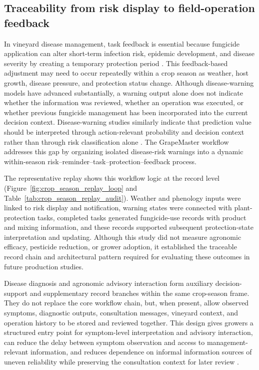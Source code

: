 \documentclass[12pt]{article}
\begin{document}
\subsection{Traceability from risk display to field-operation feedback}\label{traceability-from-risk-display-to-field-operation-feedback}

In vineyard disease management, task feedback is essential because fungicide application can alter short-term infection risk, epidemic development, and disease severity by creating a temporary protection period \citep{caffiFungicideModelsAre2018}. This feedback-based adjustment may need to occur repeatedly within a crop season as weather, host growth, disease pressure, and protection status change. Although disease-warning models have advanced substantially, a warning output alone does not indicate whether the information was reviewed, whether an operation was executed, or whether previous fungicide management has been incorporated into the current decision context. Disease-warning studies similarly indicate that prediction value should be interpreted through action-relevant probability and decision context rather than through risk classification alone \citep{yuenBayesianAnalysisPlant2002,zhaoDatadrivenModelSimulating2011}. The GrapeMaster workflow addresses this gap by organizing isolated disease-risk warnings into a dynamic within-season risk--reminder--task--protection--feedback process.

The representative replay shows this workflow logic at the record level (Figure~\ref{fig:crop_season_replay_loop} and Table~\ref{tab:crop_season_replay_audit}). Weather and phenology inputs were linked to risk display and notification, warning states were connected with plant-protection tasks, completed tasks generated fungicide-use records with product and mixing information, and these records supported subsequent protection-state interpretation and updating. Although this study did not measure agronomic efficacy, pesticide reduction, or grower adoption, it established the traceable record chain and architectural pattern required for evaluating these outcomes in future production studies.

Disease diagnosis and agronomic advisory interaction form auxiliary decision-support and supplementary record branches within the same crop-season frame. They do not replace the core workflow chain, but, when present, allow observed symptoms, diagnostic outputs, consultation messages, vineyard context, and operation history to be stored and reviewed together. This design gives growers a structured entry point for symptom-level interpretation and advisory interaction, can reduce the delay between symptom observation and access to management-relevant information, and reduces dependence on informal information sources of uneven reliability while preserving the consultation context for later review \citep{yaoInfluenceInformationSources2025,yanCDIPChatGLM3DualmodelApproach2025}.
\end{document}
